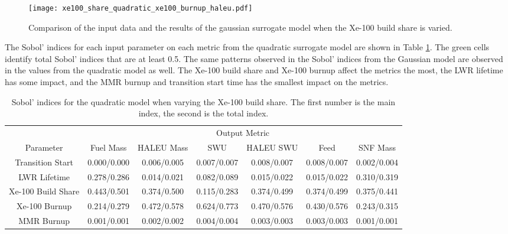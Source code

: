 \begin{figure}
    \centering 
    \texttt{[image: xe100\_share\_quadratic\_xe100\_burnup\_haleu.pdf]}
    \caption{Comparison of the input data and the results of the gaussian 
    surrogate model when the Xe-100 build share is varied.}
    \label{fig:s7_xe100_quadratic}
\end{figure}

The Sobol' indices for each input parameter on each metric from the quadratic 
surrogate model are shown in Table \ref{tab:s7_sobol_xe100_quadratic}. The 
green cells identify total Sobol' indices that are at least 0.5. The same patterns 
observed in the Sobol' indices from the Gaussian model are 
observed in the values from the quadratic model as well. The Xe-100 build share 
and Xe-100 burnup affect the metrics the most, the \gls{LWR} lifetime has some 
impact, and the \gls{MMR} burnup and transition start time has the smallest impact 
on the metrics. 

\begin{table}
    \centering
    \caption{Sobol' indices for the quadratic model when varying the Xe-100 
    build share. The first number is the main index, the second is the total 
    index.}
    \label{tab:s7_sobol_xe100_quadratic}
    \begin{tabular}{c c c c c c c}
        \hline
        & \multicolumn{6}{c}{Output Metric} \\
        Parameter & Fuel Mass & HALEU Mass & SWU & HALEU SWU & Feed & SNF Mass \\
        \hline
        Transition Start & 0.000/0.000& 0.006/0.005 & 0.007/0.007 &
                           0.008/0.007 & 0.008/0.007 & 0.002/0.004\\
        LWR Lifetime & 0.278/0.286 & 0.014/0.021 & 0.082/0.089 & 
                       0.015/0.022 & 0.015/0.022 & 0.310/0.319\\
        Xe-100 Build Share & \cellcolor{green!25}0.443/0.501 & \cellcolor{green!25}0.374/0.500 & 0.115/0.283 & 
                             0.374/0.499 & 0.374/0.499 & 0.375/0.441\\
        Xe-100 Burnup & 0.214/0.279 & \cellcolor{green!25}0.472/0.578 & \cellcolor{green!25}0.624/0.773 &
                        \cellcolor{green!25}0.470/0.576 & \cellcolor{green!25}0.430/0.576 & 0.243/0.315\\
        MMR Burnup & 0.001/0.001 & 0.002/0.002 & 0.004/0.004 &
                     0.003/0.003 & 0.003/0.003 & 0.001/0.001\\
        \hline        
    \end{tabular}
\end{table}

